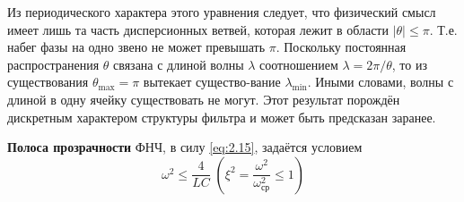Из периодического характера этого уравнения следует, что физический смысл имеет лишь та часть дисперсионных ветвей, которая лежит в области $|\theta|\leq\pi$. Т.е. набег фазы на одно звено не может превышать $\pi$. Поскольку постоянная распространения $\theta$ связана с длиной волны $\lambda$ соотношением $\lambda=2\pi/\theta$, то из существования $\theta_{\text{max}}=\pi$ вытекает существо-вание $\lambda_{\text{min}}$. Иными словами, волны с длиной в одну ячейку существовать не могут. Этот результат порождён дискретным характером структуры фильтра и может быть предсказан заранее.

\textbf{Полоса прозрачности} ФНЧ, в силу \eqref{eq:2.15}, задаётся условием
\begin{equation}
\label{eq:5.1.3}
\omega^2\leq\frac{4}{LC}\; (\xi^2=\frac{\omega^2}{\omega^2_{\text{ср}}}\leq1)
\end{equation}

